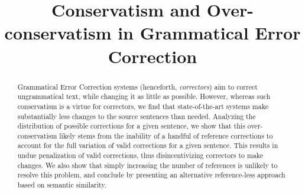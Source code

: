 \documentclass[letterpaper, 11pt]{article}
\begin{document}
\title{Conservatism and Over-conservatism in Grammatical Error Correction}
\maketitle

\begin{abstract}
  Grammatical Error Correction systems (henceforth, {\it correctors}) aim to correct ungrammatical text,
  while changing it as little as possible. However, whereas such conservatism is a virtue for correctors,
  we find that state-of-the-art systems make substantially less changes to the source sentences than needed.
  Analyzing the distribution of possible corrections for a given sentence,   
  we show that this over-conservatism likely stems from
  the inability of a handful of reference corrections to account for the full variation of valid
  corrections for a given sentence. This results in undue penalization of valid corrections,
  thus disincentivizing correctors to make changes.
  We also show that simply increasing the number of references is unlikely to resolve this problem,
  and conclude by presenting an alternative reference-less approach based on semantic similarity.
\end{abstract}
\end{document}

